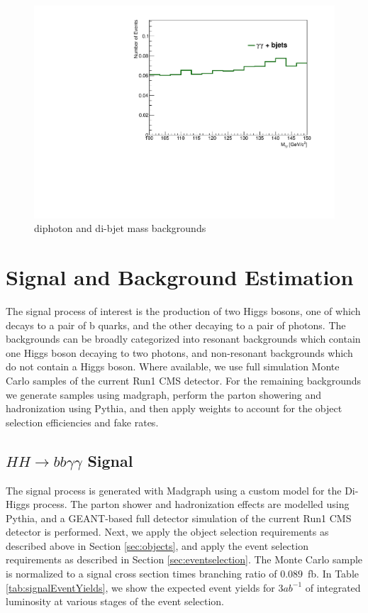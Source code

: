 \documentclass{cmspaper}
\begin{document}
\begin{figure}[h]
\includegraphics[scale=0.35, angle=0]{figures/MassGG_s2.pdf}	
\caption{diphoton and di-bjet mass backgrounds}
\label{fig:Mbb_Mgg}
\end{figure}



\section{Signal and Background Estimation}
\label{sec:bkgestimation}
The signal process of interest is the production of two Higgs bosons, one of which decays to a pair of b quarks, 
and the other decaying to a pair of photons. 
The backgrounds can be broadly categorized into resonant backgrounds which contain one Higgs boson 
decaying to two photons, and non-resonant backgrounds which do not contain a Higgs boson. 
Where available, we use full simulation Monte Carlo samples of the current Run1 CMS detector.
For the remaining backgrounds we generate samples using madgraph, perform the parton showering and
hadronization using Pythia, and then apply weights to account for the object selection efficiencies
and fake rates.

\subsection{$HH \rightarrow bb\gamma\gamma$ Signal}
The signal process is generated with Madgraph using a custom model for the Di-Higgs process. The parton
shower and hadronization effects are modelled using Pythia, and a GEANT-based full detector simulation 
of the current Run1 CMS detector is performed. Next, we apply the object selection requirements as 
described above in Section \ref{sec:objects}, and apply the event selection requirements as described 
in Section \ref{sec:eventselection}. The Monte Carlo sample is normalized to a signal cross section
times branching ratio of $0.089$~fb. In Table \ref{tab:signalEventYields}, we show the 
expected event yields for $3 ab^{-1}$ of integrated luminosity at various stages of the event
selection.
\end{document}

